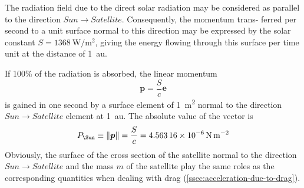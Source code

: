 The radiation ﬁeld due to the direct solar radiation may be considered as
parallel to the direction \(Sun \to Satellite\). Consequently, the momentum trans-
ferred per second to a unit surface normal to this direction may be expressed
by the solar constant \(S = \SI{1368}{\watt\per\square\m}\), giving the energy 
ﬂowing through this surface per time unit at the distance of 
\SI{1}{\astronomicalunit}.

If 100\% of the radiation is absorbed,  the linear momentum
\begin{equation}
    \bm{p} = \frac{S}{c} \bm{e}
\end{equation}
is gained in one second by a surface element of \SI{1}{\square\metre} normal to 
the direction \(Sun \to Satellite\) element at \SI{1}{\astronomicalunit}. The 
absolute value of the vector is
\begin{equation}
  \label{eq:beutler3141}
    P_{\Sun} \equiv \norm{\bm{p}} = \frac{S}{c} = \SI{4.56316e-6}{\N\per\square\m}
\end{equation}
Obviously, the surface of the cross section of the satellite normal to the 
direction \(Sun \to Satellite\) and the mass \(m\) of the satellite play the same roles as 
the corresponding quantities when dealing with drag (\ref{ssec:acceleration-due-to-drag}).


